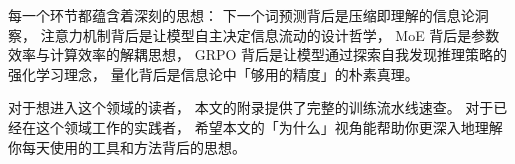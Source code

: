每一个环节都蕴含着深刻的思想：
下一个词预测背后是压缩即理解的信息论洞察，
注意力机制背后是让模型自主决定信息流动的设计哲学，
MoE 背后是参数效率与计算效率的解耦思想，
GRPO 背后是让模型通过探索自我发现推理策略的强化学习理念，
量化背后是信息论中「够用的精度」的朴素真理。

对于想进入这个领域的读者，
本文的附录提供了完整的训练流水线速查。
对于已经在这个领域工作的实践者，
希望本文的「为什么」视角能帮助你更深入地理解
你每天使用的工具和方法背后的思想。


\appendix

